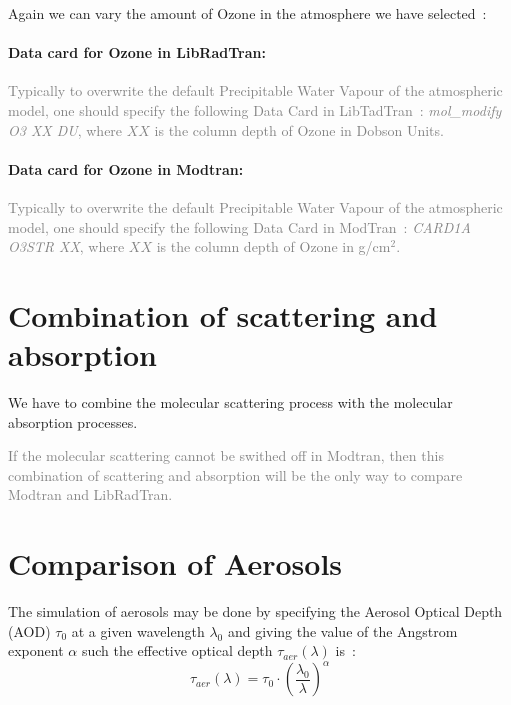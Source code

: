 \documentclass[a4paper]{article}
\begin{document}
Again we can vary the amount of Ozone in the atmosphere we have selected~:

\paragraph{Data card for Ozone in LibRadTran:}

\textcolor{gray}{
Typically to overwrite the default Precipitable Water Vapour of the atmospheric model, one should specify the following Data Card in LibTadTran~:
\textit{mol\_modify  O3   XX DU}, where $XX$ is the column depth of Ozone in Dobson Units.
}

\paragraph{Data card for Ozone in Modtran:}
\textcolor{gray}{
Typically to overwrite the default Precipitable Water Vapour of the atmospheric model, one should specify the following Data Card in ModTran~:
\textit{CARD1A O3STR  XX}, where $XX$ is the column depth of Ozone in g/cm$^2$.
}


\section{Combination of scattering and absorption}
We have to combine the molecular scattering process with the molecular absorption processes.


\textcolor{gray}{If the molecular scattering cannot be swithed off in Modtran, then this combination of scattering and absorption will be the only way to compare Modtran and LibRadTran.}


\section{Comparison of Aerosols}
The simulation of aerosols may be done by specifying the Aerosol Optical Depth (AOD) $\tau_0$ at a given wavelength $\lambda_0$ and giving the value of the Angstrom exponent $\alpha$ such the effective optical depth $\tau_{aer}(\lambda)$ is~:
\begin{equation}
\tau_{aer}(\lambda)= \tau_0 \cdot \left( \frac{\lambda_0}{\lambda}\right)^\alpha
\end{equation}
\end{document}
